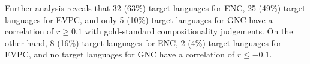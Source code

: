 \documentclass[output=paper,modfonts,nonflat]{langsci/langscibook}
\begin{document}




Further analysis reveals that 32 (63\%) target languages for ENC, 25
(49\%) target languages for EVPC, and only 5 (10\%) target languages for
GNC have a correlation of $r \ge 0.1$ with gold-standard
compositionality judgements. On the other hand, 8 (16\%) target
languages for ENC, 2 (4\%) target languages for EVPC, and no target
languages for GNC have a correlation of $r \le -0.1$.
\end{document}
